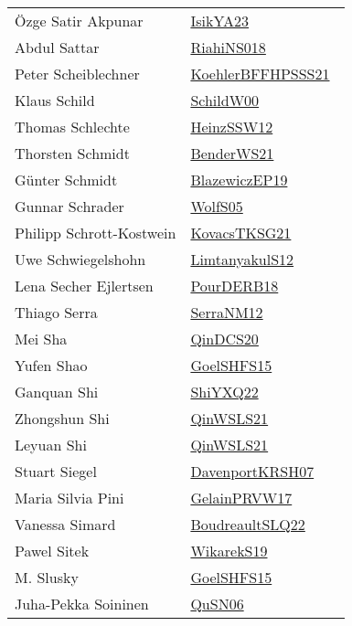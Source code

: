 {\begin{longtable}{p{4cm}p{20cm}}
{\"{O}}zge Satir Akpunar & \href{works/IsikYA23.pdf}{IsikYA23}~\cite{IsikYA23}\\
Abdul Sattar & \href{works/RiahiNS018.pdf}{RiahiNS018}~\cite{RiahiNS018}\\
Peter Scheiblechner & \href{works/KoehlerBFFHPSSS21.pdf}{KoehlerBFFHPSSS21}~\cite{KoehlerBFFHPSSS21}\\
Klaus Schild & \href{works/SchildW00.pdf}{SchildW00}~\cite{SchildW00}\\
Thomas Schlechte & \href{works/HeinzSSW12.pdf}{HeinzSSW12}~\cite{HeinzSSW12}\\
Thorsten Schmidt & \href{works/BenderWS21.pdf}{BenderWS21}~\cite{BenderWS21}\\
Günter Schmidt & \href{}{BlazewiczEP19}~\cite{BlazewiczEP19}\\
Gunnar Schrader & \href{works/WolfS05.pdf}{WolfS05}~\cite{WolfS05}\\
Philipp Schrott{-}Kostwein & \href{works/KovacsTKSG21.pdf}{KovacsTKSG21}~\cite{KovacsTKSG21}\\
Uwe Schwiegelshohn & \href{works/LimtanyakulS12.pdf}{LimtanyakulS12}~\cite{LimtanyakulS12}\\
Lena Secher Ejlertsen & \href{works/PourDERB18.pdf}{PourDERB18}~\cite{PourDERB18}\\
Thiago Serra & \href{works/SerraNM12.pdf}{SerraNM12}~\cite{SerraNM12}\\
Mei Sha & \href{works/QinDCS20.pdf}{QinDCS20}~\cite{QinDCS20}\\
Yufen Shao & \href{works/GoelSHFS15.pdf}{GoelSHFS15}~\cite{GoelSHFS15}\\
Ganquan Shi & \href{}{ShiYXQ22}~\cite{ShiYXQ22}\\
Zhongshun Shi & \href{works/QinWSLS21.pdf}{QinWSLS21}~\cite{QinWSLS21}\\
Leyuan Shi & \href{works/QinWSLS21.pdf}{QinWSLS21}~\cite{QinWSLS21}\\
Stuart Siegel & \href{works/DavenportKRSH07.pdf}{DavenportKRSH07}~\cite{DavenportKRSH07}\\
Maria Silvia Pini & \href{works/GelainPRVW17.pdf}{GelainPRVW17}~\cite{GelainPRVW17}\\
Vanessa Simard & \href{works/BoudreaultSLQ22.pdf}{BoudreaultSLQ22}~\cite{BoudreaultSLQ22}\\
Pawel Sitek & \href{works/WikarekS19.pdf}{WikarekS19}~\cite{WikarekS19}\\
M. Slusky & \href{works/GoelSHFS15.pdf}{GoelSHFS15}~\cite{GoelSHFS15}\\
Juha{-}Pekka Soininen & \href{works/QuSN06.pdf}{QuSN06}~\cite{QuSN06}\\

\end{longtable}}
